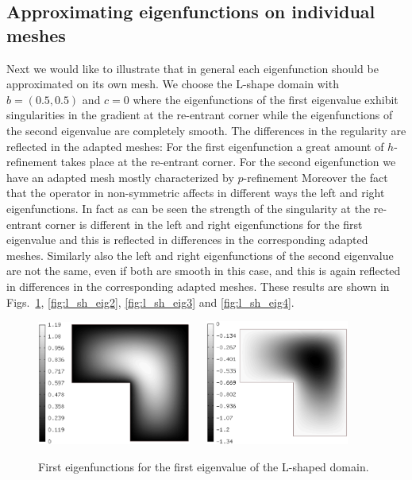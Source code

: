 \documentclass[smallextended]{svjour3}
\begin{document}
\subsection{Approximating eigenfunctions on individual meshes}\label{ssec:n_adapt}

Next we would like to illustrate that in general each eigenfunction should be approximated on its own mesh.
We choose the L-shape domain with $b=(0.5,0.5)$ and $c=0$ where the eigenfunctions of the first eigenvalue exhibit  
singularities in the gradient at the re-entrant corner while the eigenfunctions of the second eigenvalue are completely smooth.
The differences in the regularity are reflected in the adapted meshes: 
For the first eigenfunction a great amount of $h$-refinement takes place at the re-entrant corner. 
For the second eigenfunction we have an adapted mesh mostly characterized by $p$-refinement
Moreover the fact that the operator in non-symmetric affects in different ways the left and right eigenfunctions. 
In fact as can be seen the strength of the singularity at the re-entrant corner is different in the left and right eigenfunctions for the first eigenvalue and this is reflected in differences in the corresponding adapted meshes.
Similarly also the left and right eigenfunctions of the second eigenvalue are not the same, even if both are smooth in this case, and this is again reflected in differences in the corresponding adapted meshes.
These results are shown in Figs.~\ref{fig:l_sh_eig1}, \ref{fig:l_sh_eig2}, \ref{fig:l_sh_eig3} and \ref{fig:l_sh_eig4}.

\begin{figure}[!ht]
\begin{center}
\includegraphics[width=0.45\textwidth]{lshape1.eps}\ \ \ 
\includegraphics[width=0.42\textwidth]{lshape2.eps}
\end{center}
\caption{First eigenfunctions for the first eigenvalue of the L-shaped domain.}
\label{fig:l_sh_eig1}
\end{figure}
\end{document}
